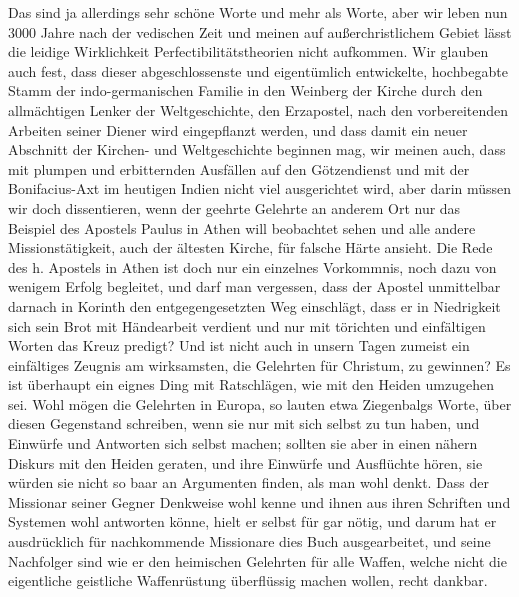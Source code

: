 \documentclass{article}
\begin{document}
Das sind ja allerdings sehr schöne Worte und mehr als Worte, aber wir leben nun 3000 Jahre nach der vedischen Zeit und meinen auf außerchristlichem Gebiet lässt die leidige Wirklichkeit Perfectibilitätstheorien nicht aufkommen. Wir glauben auch fest, dass dieser abgeschlossenste und eigentümlich entwickelte, hochbegabte Stamm der indo-germanischen Familie in den Weinberg der Kirche durch den allmächtigen Lenker der Weltgeschichte, den Erzapostel, nach den vorbereitenden Arbeiten seiner Diener wird eingepflanzt werden, und dass damit ein neuer Abschnitt der Kirchen- und Weltgeschichte beginnen mag, wir meinen auch, dass mit plumpen und erbitternden Ausfällen auf den Götzendienst und mit der Bonifacius-Axt im heutigen Indien nicht viel ausgerichtet wird, aber darin müssen wir doch dissentieren, wenn der geehrte Gelehrte an anderem Ort nur das Beispiel des Apostels Paulus in Athen will beobachtet sehen und alle andere Missionstätigkeit, auch der ältesten Kirche, für falsche Härte ansieht. Die Rede des h. Apostels in Athen ist doch nur ein einzelnes Vorkommnis, noch dazu von wenigem Erfolg begleitet, und darf man vergessen, dass der Apostel unmittelbar darnach in Korinth den entgegengesetzten Weg einschlägt, dass er in Niedrigkeit sich sein Brot mit Händearbeit verdient und nur mit törichten und einfältigen Worten das Kreuz predigt? Und ist nicht auch in unsern Tagen zumeist ein einfältiges Zeugnis am wirksamsten, die Gelehrten für Christum, zu gewinnen? Es ist überhaupt ein eignes Ding mit Ratschlägen, wie mit den Heiden umzugehen sei. Wohl mögen die Gelehrten in Europa, so lauten etwa Ziegenbalgs Worte, über diesen Gegenstand schreiben, wenn sie nur mit sich selbst zu tun haben, und Einwürfe und Antworten sich selbst machen; sollten sie aber in einen nähern Diskurs mit den Heiden geraten, und ihre Einwürfe und Ausflüchte hören, sie würden sie nicht so baar an Argumenten finden, als man wohl denkt. Dass der Missionar seiner Gegner Denkweise wohl kenne und ihnen aus ihren Schriften und Systemen wohl antworten könne, hielt er selbst für gar nötig, und darum hat er ausdrücklich für nachkommende Missionare dies Buch ausgearbeitet, und seine Nachfolger sind wie er den heimischen Gelehrten für alle Waffen, welche nicht die eigentliche geistliche Waffenrüstung überflüssig machen wollen, recht dankbar.
\end{document}
